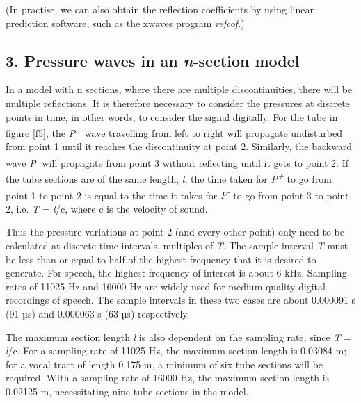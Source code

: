 \bigskip

(In practise, we can also obtain the reflection coefficients by using linear prediction software, such as the xwaves program \textit{refcof}.)

\subsection*{3. Pressure waves in an \textit{n}-section model}

In a model with n sections, where there are multiple discontinuities, there will be multiple reflections. It is therefore necessary to consider the pressures at discrete points in time, in other words, to consider the signal digitally. For the tube in figure \ref{f5}, the \textit{P\textsuperscript{+}} wave travelling from left to right will propagate undisturbed from point 1 until it reaches the discontinuity at point 2. Similarly, the backward wave \textit{P\textsuperscript{-}} will propagate from point 3 without reflecting until it gets to point 2. If the tube sections are of the same length, \textit{l}, the time taken for \textit{P\textsuperscript{+}} to go from point 1 to point 2 is equal to the time it takes for \textit{P\textsuperscript{-}} to go from point 3 to point 2, i.e. \textit{T} = \textit{l}/c, where c is the velocity of sound.

\bigskip

Thus the pressure variations at point 2 (and every other point) only need to be calculated at discrete time intervals, multiples of \textit{T}. The sample interval \textit{T} must be less than or equal to half of the highest frequency that it is desired to generate. For speech, the highest frequency of interest is about 6 kHz. Sampling rates of 11025 Hz and 16000 Hz are widely used for medium-quality digital recordings of speech. The sample intervals in these two cases are about 0.000091 s (91 µs) and 0.000063 s (63 µs) respectively.

\bigskip

The maximum section length \textit{l} is also dependent on the sampling rate, since \textit{T} = \textit{l}/c. For a sampling rate of 11025 Hz, the maximum section length is 0.03084 m; for a vocal tract of length 0.175 m, a minimum of six tube sections will be required. WIth a sampling rate of 16000 Hz, the maximum section length is 0.02125 m, necessitating nine tube sections in the model.

\bigskip

